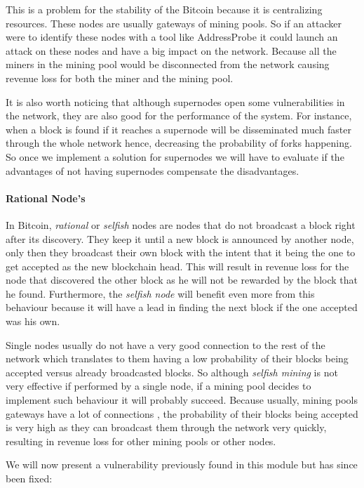 This is a problem for the stability of the Bitcoin because it is centralizing resources. These nodes are usually gateways of mining pools. So if an attacker were to identify these nodes with a tool like AddressProbe \cite{miller2015discovering} it could launch an attack on these nodes and have a big impact on the network. Because all the miners in the mining pool would be disconnected from the network causing revenue loss for both the miner and the mining pool.

It is also worth noticing that although supernodes open some vulnerabilities in the network, they are also good for the performance of the system. For instance, when a block is found if it reaches a supernode will be disseminated much faster through the whole network hence, decreasing the probability of forks happening. So once we implement a solution for supernodes we will have to evaluate if the advantages of not having supernodes compensate the disadvantages.

\paragraph*{\textbf{Rational Node's}} In Bitcoin, \textit{rational} or \textit{selfish} nodes are nodes that do not broadcast a block right after its discovery. They keep it until a new block is announced by another node, only then they broadcast their own block with the intent that it being the one to get accepted as the new blockchain head. This will result in revenue loss for the node that discovered the other block as he will not be rewarded by the block that he found. Furthermore, the \textit{selfish node} will benefit even more from this behaviour because it will have a lead in finding the next block if the one accepted was his own.

Single nodes usually do not have a very good connection to the rest of the network which translates to them having a low probability of their blocks being accepted versus already broadcasted blocks. So although \textit{selfish mining} is not very effective if performed by a single node, if a mining pool decides to implement such behaviour it will probably succeed. Because usually, mining pools gateways have a lot of connections \cite{miller2015discovering}, the probability of their blocks being accepted is very high as they can broadcast them through the network very quickly, resulting in revenue loss for other mining pools or other nodes.

We will now present a vulnerability previously found in this module but has since been fixed:

